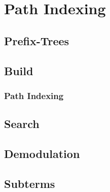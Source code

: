 
\section{Path Indexing}
\subsection{Prefix-Trees}

%	

\subsection{Build}
\begin{frame}
	\frametitle{Path Indexing}
	
\end{frame}

\subsection{Search}
\begin{frame}
	
\end{frame}

\subsection{Demodulation}
\begin{frame}
	
\end{frame}

\subsection{Subterms}
\begin{frame}
	
\end{frame}

